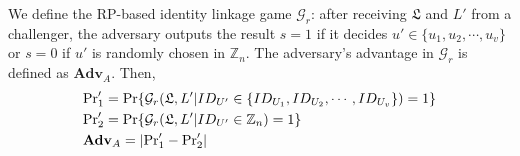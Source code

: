 {{We define the RP-based identity linkage game $\mathcal{G}_r$:
after receiving $\mathfrak{L}$ and $L'$ from a challenger,
    the adversary outputs the result $s = 1$ if it decides $u' \in \{u_1, u_2, \cdots, u_v\}$ or $s = 0$ if $u'$ is randomly chosen in $\mathbb{Z}_n$.
The adversary's advantage in $\mathcal{G}_r$ is defined as $\mathbf{Adv}_{A}$.
Then,
\begin{align*}
&{\rm Pr}'_1={\rm Pr}\{\mathcal{G}_r(\mathfrak{L}, L'|ID_{U'} \in \{ID_{U_1}, ID_{U_2}, \cdots, ID_{U_v}\})=1\} \\
&{\rm Pr}'_2={\rm Pr}\{\mathcal{G}_r(\mathfrak{L}, L'|ID_{U'} \in \mathbb{Z}_n)=1\}\\
&{\mathbf{Adv}}_{A}=|{\rm Pr}'_1-{\rm Pr}'_2|
\end{align*}

}}

